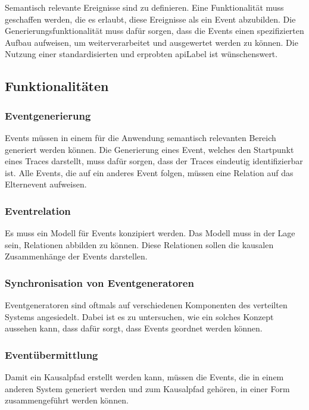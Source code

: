 Semantisch relevante Ereignisse sind zu definieren. Eine Funktionalität muss geschaffen werden, die es erlaubt, diese Ereignisse als ein Event abzubilden. Die Generierungsfunktionalität muss dafür sorgen, dass die Events einen spezifizierten Aufbau aufweisen, um weiterverarbeitet und ausgewertet werden zu können. Die Nutzung einer standardisierten und erprobten \gls{apiLabel} ist wünschenswert.
 
\subsection{Funktionalitäten}

\subsubsection{Eventgenerierung}
\label{subsubsection:Eventgenerierung}
Events müssen in einem für die Anwendung semantisch relevanten Bereich generiert werden können. Die Generierung eines Event, welches den Startpunkt eines Traces darstellt, muss dafür sorgen, dass der Traces eindeutig identifizierbar ist. Alle Events, die auf ein anderes Event folgen, müssen eine Relation auf das Elternevent aufweisen.

\subsubsection{Eventrelation}
\label{subsubsection:Eventkorrelation}
Es muss ein Modell für Events konzipiert werden. Das Modell muss in der Lage sein, Relationen abbilden zu können. Diese Relationen sollen die kausalen Zusammenhänge der Events darstellen. 

\subsubsection{Synchronisation von Eventgeneratoren}
\label{subsubsection:Synchronisation von Eventgeneratoren}
Eventgeneratoren sind oftmals auf verschiedenen Komponenten des verteilten Systems angesiedelt. Dabei ist es zu untersuchen, wie ein solches Konzept aussehen kann, dass dafür sorgt, dass Events geordnet werden können.

\subsubsection{Eventübermittlung}
\label{subsubsection:Eventübermittlung}
Damit ein Kausalpfad erstellt werden kann, müssen die Events, die in einem anderen System generiert werden und zum Kausalpfad gehören, in einer Form zusammengeführt werden können.

